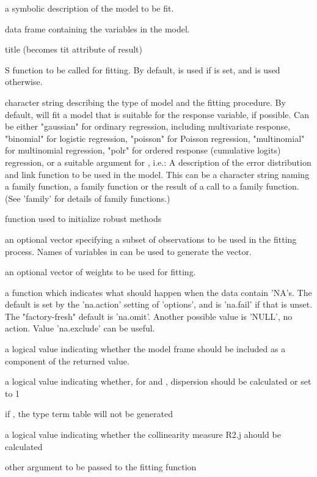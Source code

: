 \documentclass{article}
\begin{document}
\begin{Arguments}
\begin{ldescription}
\item[\code{formula}] a symbolic description of the model to be fit. 
\item[\code{data}] data frame containing the variables in the model. 
\item[\code{tit}] title (becomes tit attribute of result) 
\item[\code{method}] S function to be called for fitting.
By default,  is used if  is set, and
 is used otherwise. 
\item[\code{family}] character string describing the type of model and the
fitting procedure. By default,  will fit a model that is
suitable for the response variable, if possible.\bsl{}
Can be either
"gaussian" for ordinary regression, including multivariate response,
"binomial" for logistic regression,
"poisson"  for Poisson regression,
"multinomial" for multinomial regression,
"polr" for ordered response (cumulative logits) regression,
or a suitable argument for , i.e.: A
description of the error distribution and link
function to be used in the model. This can be a character string
naming a family function, a family function or the result of a call
to a family function.  (See 'family' for details of family functions.) 
\item[\code{init.reg}] function used to initialize robust methods 
\item[\code{subset}] an optional vector specifying a subset of observations to be
used in the fitting process. Names of variables in  can
be used to generate the vector. 
\item[\code{weights}] an optional vector of weights to be used for fitting. 
\item[\code{na.action}] a function which indicates what should happen when the data
contain 'NA's.  The default is set by the 'na.action' setting
of 'options', and is 'na.fail' if that is unset.  The
"factory-fresh" default is 'na.omit'.  Another possible value
is 'NULL', no action.  Value 'na.exclude' can be useful. 
\item[\code{model}] a logical value indicating whether the model frame should be
included as a component of the returned value. 
\item[\code{calcdisp}] a logical value indicating whether, for
 and , dispersion
should be calculated  or set to 1  
\item[\code{termtable}] if , the  type term table will
not be generated
\item[\code{vif}] a logical value indicating whether the collinearity
measure R2.j ahould be calculated 
\item[\code{...}] other argument to be passed to the fitting function 
\end{ldescription}
\end{Arguments}
\end{document}
